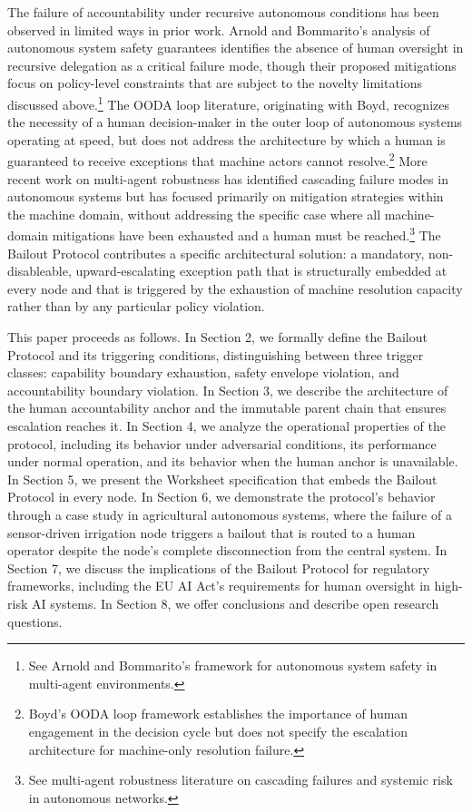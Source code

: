 The failure of accountability under recursive autonomous conditions has been observed in limited ways in prior work. Arnold and Bommarito's analysis of autonomous system safety guarantees identifies the absence of human oversight in recursive delegation as a critical failure mode, though their proposed mitigations focus on policy-level constraints that are subject to the novelty limitations discussed above.\footnote{See Arnold and Bommarito's framework for autonomous system safety in multi-agent environments.} The OODA loop literature, originating with Boyd, recognizes the necessity of a human decision-maker in the outer loop of autonomous systems operating at speed, but does not address the architecture by which a human is guaranteed to receive exceptions that machine actors cannot resolve.\footnote{Boyd's OODA loop framework establishes the importance of human engagement in the decision cycle but does not specify the escalation architecture for machine-only resolution failure.} More recent work on multi-agent robustness has identified cascading failure modes in autonomous systems but has focused primarily on mitigation strategies within the machine domain, without addressing the specific case where all machine-domain mitigations have been exhausted and a human must be reached.\footnote{See multi-agent robustness literature on cascading failures and systemic risk in autonomous networks.} The Bailout Protocol contributes a specific architectural solution: a mandatory, non-disableable, upward-escalating exception path that is structurally embedded at every node and that is triggered by the exhaustion of machine resolution capacity rather than by any particular policy violation.

This paper proceeds as follows. In Section 2, we formally define the Bailout Protocol and its triggering conditions, distinguishing between three trigger classes: capability boundary exhaustion, safety envelope violation, and accountability boundary violation. In Section 3, we describe the architecture of the human accountability anchor and the immutable parent chain that ensures escalation reaches it. In Section 4, we analyze the operational properties of the protocol, including its behavior under adversarial conditions, its performance under normal operation, and its behavior when the human anchor is unavailable. In Section 5, we present the Worksheet specification that embeds the Bailout Protocol in every node. In Section 6, we demonstrate the protocol's behavior through a case study in agricultural autonomous systems, where the failure of a sensor-driven irrigation node triggers a bailout that is routed to a human operator despite the node's complete disconnection from the central system. In Section 7, we discuss the implications of the Bailout Protocol for regulatory frameworks, including the EU AI Act's requirements for human oversight in high-risk AI systems. In Section 8, we offer conclusions and describe open research questions.